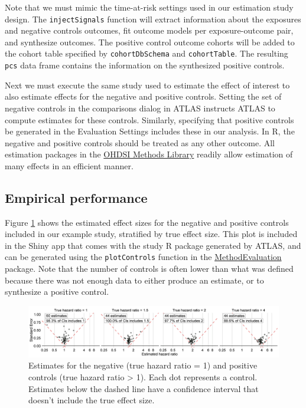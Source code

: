 \documentclass[11pt]{book}
\theoremstyle{definition}
\theoremstyle{definition}
\theoremstyle{definition}
\theoremstyle{remark}
\begin{document}
Note that we must mimic the time-at-risk settings used in our estimation study design. The \texttt{injectSignals} function will extract information about the exposures and negative controls outcomes, fit outcome models per exposure-outcome pair, and synthesize outcomes. The positive control outcome cohorts will be added to the cohort table specified by \texttt{cohortDbSchema} and \texttt{cohortTable}. The resulting \texttt{pcs} data frame contains the information on the synthesized positive controls.

Next we must execute the same study used to estimate the effect of interest to also estimate effects for the negative and positive controls. Setting the set of negative controls in the comparisons dialog in ATLAS instructs ATLAS to compute estimates for these controls. Similarly, specifying that positive controls be generated in the Evaluation Settings includes these in our analysis. In R, the negative and positive controls should be treated as any other outcome. All estimation packages in the \href{https://ohdsi.github.io/MethodsLibrary/}{OHDSI Methods Library} readily allow estimation of many effects in an efficient manner.

\hypertarget{empirical-performance}{%
\subsection{Empirical performance}\label{empirical-performance}}

Figure \ref{fig:controls} shows the estimated effect sizes for the negative and positive controls included in our example study, stratified by true effect size. This plot is included in the Shiny app that comes with the study R package generated by ATLAS, and can be generated using the \texttt{plotControls} function in the \href{https://ohdsi.github.io/MethodEvaluation/}{MethodEvaluation} package. Note that the number of controls is often lower than what was defined because there was not enough data to either produce an estimate, or to synthesize a positive control.

\begin{figure}

{\centering \includegraphics[width=1\linewidth]{images/MethodValidity/controls} 

}

\caption{Estimates for the negative (true hazard ratio = 1) and positive controls (true hazard ratio > 1). Each dot represents a control. Estimates below the dashed line have a confidence interval that doesn't include the true effect size.}\label{fig:controls}
\end{figure}
\end{document}
